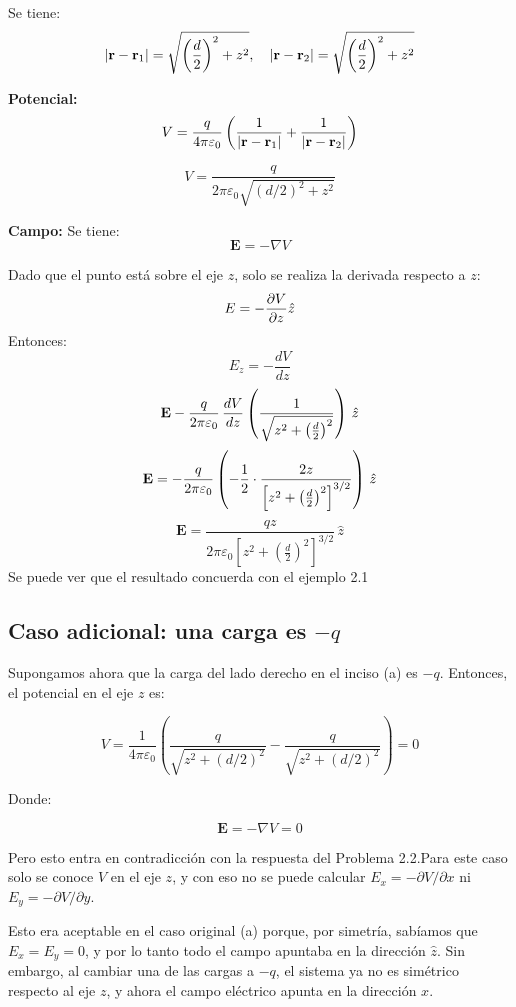 \documentclass[12pt]{article}
\begin{document}
Se tiene:
\[
\abs{\mathbf{r} - \mathbf{r}_1} = \sqrt{\left(\frac{d}{2}\right)^2 + z^2}, \quad \abs{\mathbf{r} - \mathbf{r}_2} = \sqrt{\left(\frac{d}{2}\right)^2 + z^2}
\]

\textbf{Potencial:}
\[
V = \frac{q}{4\pi\varepsilon_0} \left( \frac{1}{\abs{\mathbf{r} - \mathbf{r}_1}} + \frac{1}{\abs{\mathbf{r} - \mathbf{r}_2}} \right) \]

\[V= \frac{q}{2\pi\varepsilon_0 \sqrt{(d/2)^2 + z^2}}
\]

\textbf{Campo:}
Se tiene:
\[
\mathbf{E} = -\nabla V
\]

Dado que el punto está sobre el eje \(z\), solo se realiza  la derivada respecto a \(z\):
\[
E = -\pdv{V}{z} \hat{z}
\]
Entonces:
\[
E_z = -\frac{dV}{dz} 
\]
\[
\mathbf{E}  -\frac{q}{2\pi \varepsilon_0} \, \frac{dV}{dz}  \left( \frac{1}{\sqrt{z^2 + \left( \frac{d}{2} \right)^2}} \right) \, \hat{z} \\
\]
\[
\mathbf{E} = -\frac{q}{2\pi \varepsilon_0} \left( -\frac{1}{2} \cdot \frac{2z}{\left[ z^2 + \left( \frac{d}{2} \right)^2 \right]^{3/2}} \right) \, \hat{z} \\
\]
\[
\mathbf{E}= \frac{qz}{2\pi \varepsilon_0 \left[ z^2 + \left( \frac{d}{2} \right)^2 \right]^{3/2}} \, \hat{z} 
\]
Se puede ver que el resultado concuerda con el ejemplo 2.1

\subsection*{Caso adicional: una carga es $-q$}


Supongamos ahora que la carga del lado derecho en el inciso (a) es \(-q\). Entonces, el potencial en el eje \(z\) es:

\[
V = \frac{1}{4\pi\varepsilon_0} \left( \frac{q}{\sqrt{z^2 + (d/2)^2}} - \frac{q}{\sqrt{z^2 + (d/2)^2}} \right) = 0
\]

Donde:

\[
\mathbf{E} = -\nabla V = 0
\]

Pero esto entra en contradicción con la respuesta del Problema 2.2.Para este caso solo se conoce  \(V\) en el eje \(z\), y con eso no se puede calcular \(E_x = -\partial V/\partial x\) ni \(E_y = -\partial V/\partial y\).

Esto era aceptable en el caso original (a) porque, por simetría, sabíamos que \(E_x = E_y = 0\), y por lo tanto todo el campo apuntaba en la dirección \(\hat{z}\). Sin embargo, al cambiar una de las cargas a \(-q\), el sistema ya no es simétrico respecto al eje \(z\), y ahora el campo eléctrico apunta en la dirección \(x\).
\end{document}

